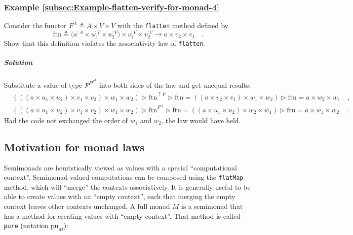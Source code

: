 \subsubsection{Example \label{subsec:Example-flatten-verify-for-monad-4}\ref{subsec:Example-flatten-verify-for-monad-4}}

Consider the functor $F^{A}\triangleq A\times V\times V$ with the
\lstinline!flatten! method defined by
\[
\text{ftn}\triangleq\big(a^{:A}\times u_{1}^{:V}\times u_{2}^{:V}\big)\times v_{1}^{:V}\times v_{2}^{:V}\rightarrow a\times v_{2}\times v_{1}\quad.
\]
Show that this definition violates the associativity law of \lstinline!flatten!.

\subparagraph{Solution}

Substitute a value of type $F^{F^{F^{A}}}$ into both sides of the
law and get unequal results:
\begin{align*}
 & \left(\left(\left(a\times u_{1}\times u_{2}\right)\times v_{1}\times v_{2}\right)\times w_{1}\times w_{2}\right)\triangleright\text{ftn}^{\uparrow F}\triangleright\text{ftn}=\left(\left(a\times v_{2}\times v_{1}\right)\times w_{1}\times w_{2}\right)\triangleright\text{ftn}=a\times w_{2}\times w_{1}\quad,\\
 & \left(\left(\left(a\times u_{1}\times u_{2}\right)\times v_{1}\times v_{2}\right)\times w_{1}\times w_{2}\right)\triangleright\text{ftn}^{F^{A}}\triangleright\text{ftn}=\left(\left(a\times u_{1}\times u_{2}\right)\times w_{2}\times w_{1}\right)\triangleright\text{ftn}=a\times w_{1}\times w_{2}\quad.
\end{align*}
Had the code not exchanged the order of $w_{1}$ and $w_{2}$, the
law would have held.

\subsection{Motivation for monad laws}

Semimonads are heuristically viewed as values with a special \textsf{``}computational
context\textsf{''}. Semimonad-valued computations can be composed using the
\lstinline!flatMap! method, which will \textsf{``}merge\textsf{''} the contexts associatively.
It is generally useful to be able to create values with an \textsf{``}empty
context\textsf{''}, such that merging the empty context leaves other contexts
unchanged. A full monad $M$ is a semimonad that has a method for
creating values with \textsf{``}empty context\textsf{''}. That method is called \lstinline!pure!
(notation $\text{pu}_{M}$):

